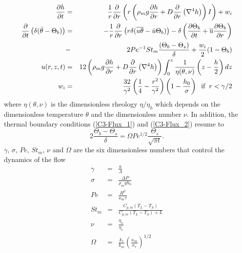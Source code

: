  \begin{eqnarray}
  \frac{\partial h}{\partial t}& =& \frac{1}{r}
  \frac{\partial}{\partial r} \left( r\left(\rho_m g \frac{\partial h}{\partial      r}+D\frac{\partial}{\partial      r}\left(\nabla^4h\right)\right)I\right)
  + w_i\label{EqFinal1}\\
    \frac{\partial}{\partial
    t}\left( \delta( \bar{\theta}-\Theta_b)\right)&=&-\frac{1}{r}\frac{\partial}{\partial
                                                      r}  \left(   r\delta(\overline{u\theta}-\bar{u}\Theta_b)\right)  -
                                                      \delta\left(      \frac{\partial       \Theta_b}{\partial      t}+
                                                      \overline{u}\frac{\partial     \Theta_b}{\partial    r}\right)\nonumber\\
                                 &-&
                                     2Pe^{-1}St_m\frac{\left(\Theta_b-\Theta_s\right)}{\delta}+\frac{w_{i}}{2}(1-\Theta_b)\label{HeatDimensionLess}\\
    u(r,z,t)&   =&   12\left(\rho_m   g   \frac{\partial   h}{\partial
                 r}+D\frac{\partial}{\partial
                   r}\left(\nabla^4h\right)\right)            \int_0^z
                   \frac{1}{\eta(\theta,\nu)}
                   \left(z-\frac{h}{2}\right)dz\label{C3-Veloc}\\
    w_{i}&=&
             \frac{32}{\gamma^{2}}\left(\frac{1}{4}-\frac{r^{2}}{\gamma^{2}}\right)\left(1-\frac{h_0}{\sigma}\right)\hspace{.2cm}
             \text{if} \hspace{.2cm} r < \gamma/2
  \end{eqnarray}
  where $\eta(\theta,\nu)$ is the dimensionless rheology $\eta/\eta_h$
  which  depends on  the  dimensionless temperature  $\theta$ and  the
  dimensionless  number  $\nu$.   In addition,  the  thermal  boundary
  conditions (\ref{C3-Flux_1}) and (\ref{C3-Flux_2}) resume to
  \begin{equation}
    2\frac{\Theta_b-\Theta_s}{\delta}               =               \Omega
    Pe^{1/2}\frac{\Theta_s}{\sqrt{\pi t}}.
    \label{C3-Boundary-Condi}
  \end{equation}
  $\gamma$, $\sigma$,  $Pe$, $St_m$,  $\nu$ and  $\Omega$ are  the six
  dimensionless numbers that control the dynamics of the flow
  \begin{eqnarray}
    \gamma&=&\frac{a}{\Lambda} \label{gamma}\\
    \sigma &=& \frac{\Delta P}{\rho_m g h_0} \label{sigma}\\
    Pe&=& \frac{H^2}{\kappa_m \tau}\label{Pe}\\
    St_m &=& \frac{C_{p,m}\left(T_L-T_S\right)}{C_{p,m}\left(T_L-T_S\right)+L} \label{St}\\
    \nu&=& \frac{\eta_h}{\eta_c}\label{nu}\\
    \Omega&=&\frac{k_r}{k_m}\left(\frac{\kappa_m}{\kappa_r}\right)^{1/2}\label{omega}
  \end{eqnarray}
